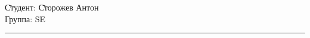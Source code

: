 \begin{tabbing}
\hspace{11cm} \= Студент: \= Сторожев Антон \\
  \> Группа: \> SE \\
\end{tabbing}
\hrule
\vspace{1cm}

